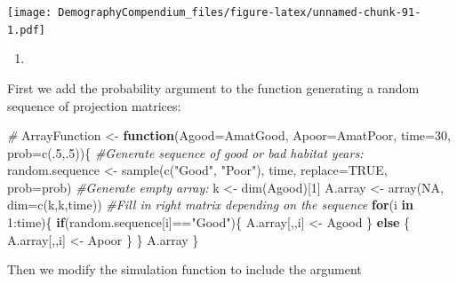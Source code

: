 \documentclass[
]{book}
\newenvironment{Shaded}{\begin{snugshade}}{\end{snugshade}}
\newcommand{\AttributeTok}[1]{\textcolor[rgb]{0.77,0.63,0.00}{#1}}
\newcommand{\CommentTok}[1]{\textcolor[rgb]{0.56,0.35,0.01}{\textit{#1}}}
\newcommand{\ConstantTok}[1]{\textcolor[rgb]{0.00,0.00,0.00}{#1}}
\newcommand{\ControlFlowTok}[1]{\textcolor[rgb]{0.13,0.29,0.53}{\textbf{#1}}}
\newcommand{\DecValTok}[1]{\textcolor[rgb]{0.00,0.00,0.81}{#1}}
\newcommand{\FunctionTok}[1]{\textcolor[rgb]{0.00,0.00,0.00}{#1}}
\newcommand{\NormalTok}[1]{#1}
\newcommand{\OtherTok}[1]{\textcolor[rgb]{0.56,0.35,0.01}{#1}}
\newcommand{\SpecialCharTok}[1]{\textcolor[rgb]{0.00,0.00,0.00}{#1}}
\newcommand{\StringTok}[1]{\textcolor[rgb]{0.31,0.60,0.02}{#1}}
\providecommand{\tightlist}{%
  \setlength{\itemsep}{0pt}\setlength{\parskip}{0pt}}
\begin{document}
\texttt{[image: DemographyCompendium\_files/figure-latex/unnamed-chunk-91-1.pdf]}

\begin{enumerate}
\def\labelenumi{\arabic{enumi}.}
\setcounter{enumi}{3}
\tightlist
\item
\end{enumerate}

First we add the probability argument to the function generating a random sequence of projection matrices:

\begin{Shaded}
\begin{Highlighting}[]
\CommentTok{\#}
\NormalTok{ArrayFunction }\OtherTok{\textless{}{-}} \ControlFlowTok{function}\NormalTok{(}\AttributeTok{Agood=}\NormalTok{AmatGood, }\AttributeTok{Apoor=}\NormalTok{AmatPoor, }\AttributeTok{time=}\DecValTok{30}\NormalTok{, }\AttributeTok{prob=}\FunctionTok{c}\NormalTok{(.}\DecValTok{5}\NormalTok{,.}\DecValTok{5}\NormalTok{))\{}
  \CommentTok{\#Generate sequence of good or bad habitat years:}
\NormalTok{  random.sequence }\OtherTok{\textless{}{-}} \FunctionTok{sample}\NormalTok{(}\FunctionTok{c}\NormalTok{(}\StringTok{"Good"}\NormalTok{, }\StringTok{"Poor"}\NormalTok{), time, }\AttributeTok{replace=}\ConstantTok{TRUE}\NormalTok{, }\AttributeTok{prob=}\NormalTok{prob)}
  \CommentTok{\#Generate empty array:}
\NormalTok{  k }\OtherTok{\textless{}{-}} \FunctionTok{dim}\NormalTok{(Agood)[}\DecValTok{1}\NormalTok{]}
\NormalTok{  A.array }\OtherTok{\textless{}{-}} \FunctionTok{array}\NormalTok{(}\ConstantTok{NA}\NormalTok{, }\AttributeTok{dim=}\FunctionTok{c}\NormalTok{(k,k,time))}
  \CommentTok{\#Fill in right matrix depending on the sequence}
  \ControlFlowTok{for}\NormalTok{(i }\ControlFlowTok{in} \DecValTok{1}\SpecialCharTok{:}\NormalTok{time)\{}
    \ControlFlowTok{if}\NormalTok{(random.sequence[i]}\SpecialCharTok{==}\StringTok{"Good"}\NormalTok{)\{}
\NormalTok{      A.array[,,i] }\OtherTok{\textless{}{-}}\NormalTok{ Agood}
\NormalTok{    \}}
    \ControlFlowTok{else}\NormalTok{ \{}
\NormalTok{       A.array[,,i] }\OtherTok{\textless{}{-}}\NormalTok{ Apoor}
\NormalTok{    \}}
\NormalTok{  \}}
\NormalTok{  A.array}
\NormalTok{\}}
\end{Highlighting}
\end{Shaded}

Then we modify the simulation function to include the argument
\end{document}
